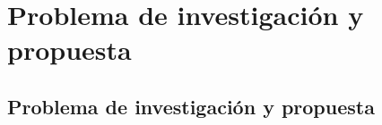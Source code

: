 \chapter*{Problema de investigación y propuesta}\label{ch:problemainvestigacion}

\section{Problema de investigación y propuesta}








